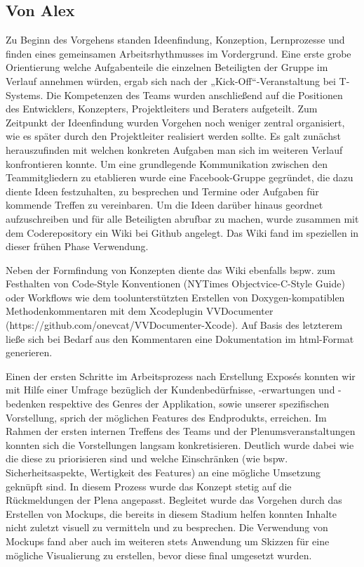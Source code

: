 \subsection{Von Alex}
	Zu Beginn des Vorgehens standen Ideenfindung, Konzeption, Lernprozesse und finden eines gemeinsamen Arbeitsrhythmusses im Vordergrund. Eine erste grobe Orientierung welche Aufgabenteile die einzelnen Beteiligten der Gruppe im Verlauf annehmen würden, ergab sich nach der „Kick-Off“-Veranstaltung bei T-Systems. Die Kompetenzen des Teams wurden anschließend auf die Positionen des Entwicklers, Konzepters, Projektleiters und Beraters aufgeteilt. Zum Zeitpunkt der Ideenfindung wurden Vorgehen noch weniger zentral organisiert, wie es später durch den Projektleiter realisiert werden sollte. Es galt zunächst herauszufinden mit welchen konkreten Aufgaben man sich im weiteren Verlauf konfrontieren konnte. Um eine grundlegende Kommunikation zwischen den Teammitgliedern zu etablieren wurde eine Facebook-Gruppe gegründet, die dazu diente Ideen festzuhalten, zu besprechen und Termine oder Aufgaben für kommende Treffen zu vereinbaren. Um die Ideen darüber hinaus geordnet aufzuschreiben und für alle Beteiligten abrufbar zu machen, wurde zusammen mit dem Coderepository ein Wiki bei Github angelegt. Das Wiki fand im speziellen in dieser 	frühen Phase Verwendung.

	Neben der Formfindung von Konzepten diente das Wiki ebenfalls bspw. zum Festhalten von Code-Style Konventionen (NYTimes Objectvice-C-Style Guide) oder Workflows wie dem toolunterstützten Erstellen von Doxygen-kompatiblen Methodenkommentaren mit dem Xcodeplugin VVDocumenter (https://github.com/onevcat/VVDocumenter-Xcode). Auf Basis des letzterem ließe sich bei Bedarf aus den Kommentaren eine Dokumentation im html-Format generieren. 

	Einen der ersten Schritte im Arbeitsprozess nach Erstellung Exposés konnten wir mit Hilfe einer Umfrage bezüglich der Kundenbedürfnisse, -erwartungen und -bedenken respektive des Genres der Applikation, sowie unserer spezifischen Vorstellung, sprich der möglichen Features des Endprodukts, erreichen. Im Rahmen der ersten internen Treffens des Teams und der Plenumsveranstaltungen konnten sich die Vorstellungen langsam konkretisieren. Deutlich wurde dabei wie die diese zu priorisieren sind und welche Einschränken (wie bspw. Sicherheitsaspekte, Wertigkeit des Features) an eine mögliche Umsetzung geknüpft sind. In diesem Prozess wurde das Konzept stetig auf die Rückmeldungen der Plena angepasst. Begleitet wurde das Vorgehen durch das Erstellen von Mockups, die bereits in diesem Stadium helfen konnten Inhalte nicht zuletzt visuell zu vermitteln und zu besprechen. Die Verwendung von Mockups fand aber auch im weiteren stets Anwendung um Skizzen für eine mögliche Visualierung zu erstellen, bevor diese final umgesetzt wurden.

